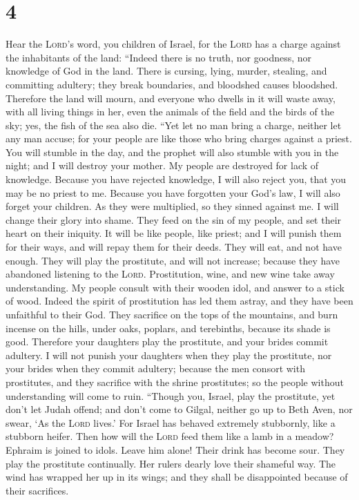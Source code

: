 \hypertarget{section-3}{%
\section{4}\label{section-3}}

 Hear the \textsc{Lord}'s word, you children of Israel,
for the \textsc{Lord} has a charge against the inhabitants of the land:
``Indeed there is no truth, nor goodness, nor knowledge of God in the
land.  There is cursing, lying, murder, stealing, and
committing adultery; they break boundaries, and bloodshed causes
bloodshed.  Therefore the land will mourn, and everyone
who dwells in it will waste away, with all living things in her, even
the animals of the field and the birds of the sky; yes, the fish of the
sea also die.  ``Yet let no man bring a charge, neither
let any man accuse; for your people are like those who bring charges
against a priest.  You will stumble in the day, and the
prophet will also stumble with you in the night; and I will destroy your
mother.  My people are destroyed for lack of knowledge.
Because you have rejected knowledge, I will also reject you, that you
may be no priest to me. Because you have forgotten your God's law, I
will also forget your children.  As they were multiplied,
so they sinned against me. I will change their glory into shame.
 They feed on the sin of my people, and set their heart on
their iniquity.  It will be like people, like priest; and
I will punish them for their ways, and will repay them for their deeds.
 They will eat, and not have enough. They will play the
prostitute, and will not increase; because they have abandoned listening
to the \textsc{Lord}.  Prostitution, wine, and new wine
take away understanding.  My people consult with their
wooden idol, and answer to a stick of wood. Indeed the spirit of
prostitution has led them astray, and they have been unfaithful to their
God.  They sacrifice on the tops of the mountains, and
burn incense on the hills, under oaks, poplars, and terebinths, because
its shade is good. Therefore your daughters play the prostitute, and
your brides commit adultery.  I will not punish your
daughters when they play the prostitute, nor your brides when they
commit adultery; because the men consort with prostitutes, and they
sacrifice with the shrine prostitutes; so the people without
understanding will come to ruin.  ``Though you, Israel,
play the prostitute, yet don't let Judah offend; and don't come to
Gilgal, neither go up to Beth Aven, nor swear, `As the \textsc{Lord}
lives.'  For Israel has behaved extremely stubbornly,
like a stubborn heifer. Then how will the \textsc{Lord} feed them like a
lamb in a meadow?  Ephraim is joined to idols. Leave him
alone!  Their drink has become sour. They play the
prostitute continually. Her rulers dearly love their shameful way.
 The wind has wrapped her up in its wings; and they shall
be disappointed because of their sacrifices.


